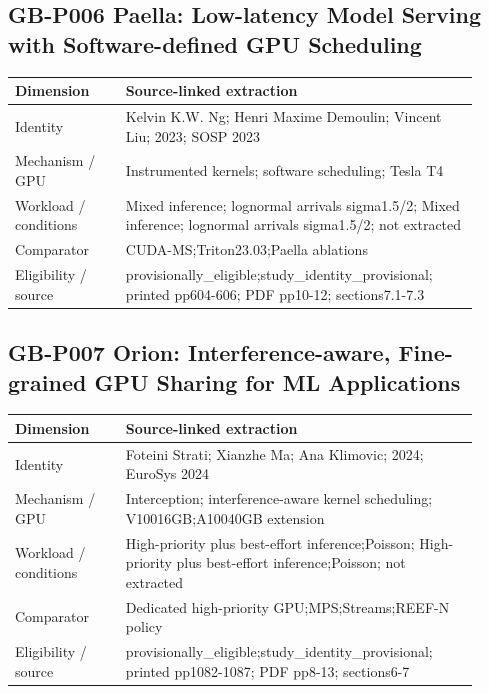 \documentclass[12pt,a4paper]{article}
\begin{document}
\subsection*{GB-P006 Paella:\allowbreak{} Low-latency Model Serving with Software-defined GPU Scheduling}
\cite{GB-P006}

{\small\begin{longtable}{>{\raggedright\arraybackslash}p{0.22\linewidth}>{\raggedright\arraybackslash}p{0.7\linewidth}}
\toprule
Dimension & Source-linked extraction\\\midrule
\endhead
Identity & Kelvin K.W. Ng; Henri Maxime Demoulin; Vincent Liu; 2023; SOSP 2023\\
Mechanism /\allowbreak{} GPU & Instrumented kernels; software scheduling; Tesla T4\\
Workload /\allowbreak{} conditions & Mixed inference; lognormal arrivals sigma1.5/\allowbreak{}2; Mixed inference; lognormal arrivals sigma1.5/\allowbreak{}2; not extracted\\
Comparator & CUDA-MS;Triton23.03;Paella ablations\\
Eligibility /\allowbreak{} source & provisionally\_\allowbreak{}eligible;study\_\allowbreak{}identity\_\allowbreak{}provisional; printed pp604-606; PDF pp10-12; sections7.1-7.3\\
\bottomrule
\end{longtable}}

\subsection*{GB-P007 Orion:\allowbreak{} Interference-aware, Fine-grained GPU Sharing for ML Applications}
\cite{GB-P007}

{\small\begin{longtable}{>{\raggedright\arraybackslash}p{0.22\linewidth}>{\raggedright\arraybackslash}p{0.7\linewidth}}
\toprule
Dimension & Source-linked extraction\\\midrule
\endhead
Identity & Foteini Strati; Xianzhe Ma; Ana Klimovic; 2024; EuroSys 2024\\
Mechanism /\allowbreak{} GPU & Interception; interference-aware kernel scheduling; V10016GB;A10040GB extension\\
Workload /\allowbreak{} conditions & High-priority plus best-effort inference;Poisson; High-priority plus best-effort inference;Poisson; not extracted\\
Comparator & Dedicated high-priority GPU;MPS;Streams;REEF-N policy\\
Eligibility /\allowbreak{} source & provisionally\_\allowbreak{}eligible;study\_\allowbreak{}identity\_\allowbreak{}provisional; printed pp1082-1087; PDF pp8-13; sections6-7\\
\bottomrule
\end{longtable}}
\end{document}
